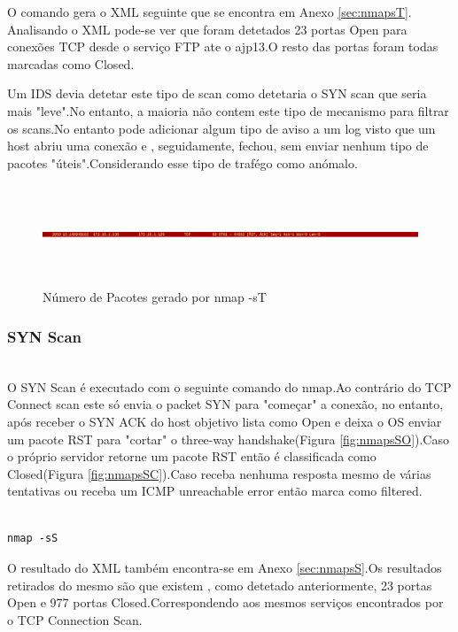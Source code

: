 O comando gera o XML seguinte que se encontra em Anexo \ref{sec:nmapsT}.
Analisando o XML pode-se ver que foram detetados 23 portas Open para conexões TCP desde o serviço FTP ate o ajp13.O resto das portas foram todas marcadas como Closed.

Um IDS devia detetar este tipo de scan como detetaria o SYN scan que seria mais "leve".No entanto, a maioria não contem este tipo de mecanismo para filtrar os scans.No entanto pode adicionar algum tipo de aviso a um log visto que um host abriu uma conexão e , seguidamente, fechou, sem enviar nenhum tipo de pacotes "úteis".Considerando esse tipo de trafégo como anómalo.

\begin{figure}[h!]
	\centering
		
	\includegraphics[width=\textwidth,height=3cm,keepaspectratio]{images/nmapsTPacotes.png}
		
	\caption{Número de Pacotes gerado por nmap -sT}
		
	\label{fig:nmapsTPacotes}
\end{figure}

\subsubsection{SYN Scan}
\hfill\\

O SYN Scan é executado com o seguinte comando do nmap.Ao contrário do TCP Connect scan este só envia o packet SYN para "começar" a conexão, no entanto, após receber o SYN ACK do host objetivo lista como Open e deixa o OS enviar um pacote RST para "cortar" o three-way handshake(Figura \ref{fig:nmapsSO}).Caso o próprio servidor retorne um pacote RST então é classificada como Closed(Figura \ref{fig:nmapsSC}).Caso receba nenhuma resposta mesmo de várias tentativas ou receba um ICMP unreachable error então marca como filtered.

\begin{lstlisting}

nmap -sS

\end{lstlisting}

O resultado do XML também encontra-se em Anexo \ref{sec:nmapsS}.Os resultados retirados do mesmo são que existem , como detetado anteriormente, 23 portas Open e 977 portas Closed.Correspondendo aos mesmos serviços encontrados por o TCP Connection Scan.

